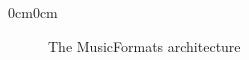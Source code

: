 


\begin{adjustwidth}{0cm}{0cm}
\begin{figure}[ht]
\caption {The MusicFormats architecture}
\label{The MusicFormats architecture LABEL 2}
\begin{center}


\def \bendAngle {60}

\def \minimumRectangleHeight {10 mm}
\def \minimumRectangleWidth  {30 mm}

\def \separatorWidth {\minimumRectangleWidth}

\def \roundedCorners {10pt}


\begin{tikzpicture}[
	scale=0.42,
	>=open triangle 45,
	]



\end{tikzpicture}
\end{center}
\end{figure}
\end{adjustwidth}
